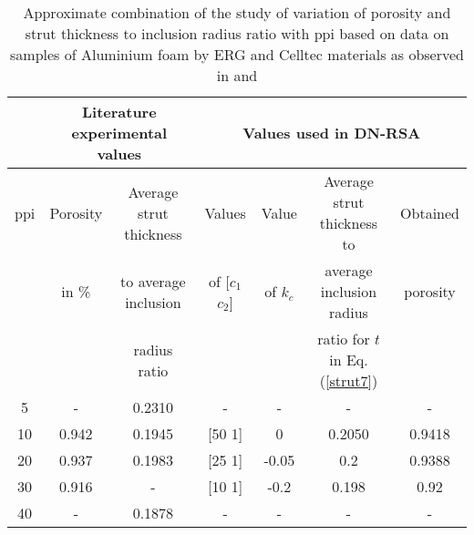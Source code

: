 \begin{table*}[t]
\small{
	\begin{center}
		\caption{Approximate combination of the study of variation of porosity and strut thickness to inclusion radius ratio with ppi based on data on samples of Aluminium foam by ERG and Celltec materials as observed in \cite{perrotPeriodicUnitCell2007} and \cite{jungMicrostructuralCharacterisationExperimental2017}}\label{tab_ppi}
		\begin{tabular}{c | c c | c c c c}
			\toprule
			& \multicolumn{2}{c|}{Literature experimental values} & \multicolumn{4}{c}{Values used in DN-RSA}\\[0.5ex]
			\midrule
			
			ppi & Porosity & Average strut thickness &  Values  & Value  &   Average strut thickness to & Obtained \\[0.5ex]
			& in \% \cite{jungMicrostructuralCharacterisationExperimental2017} & to average inclusion  & of [$ c_1 $ $ c_2 $]&of $ k_c $& average inclusion radius & porosity\\[0.5ex]
			& & radius ratio \cite{perrotPeriodicUnitCell2007}& & & ratio for $ t $ in Eq. (\ref{strut7}) &\\[0.5ex]
			\midrule
			5 & - & 0.2310 &- &- &- &-\\[1ex]
			10 & 0.942 & 0.1945&[50 1] &0&0.2050&0.9418 \\[1ex]
			20 & 0.937 & 0.1983& [25 1]&-0.05&0.2&0.9388\\[1ex]
			30 & 0.916 & -&[10 1]&-0.2 &0.198 &0.92\\[1ex]
			40 & - & 0.1878& -& -& -&-\\[1ex]
			\bottomrule
		\end{tabular}
	\end{center}}
\end{table*}




